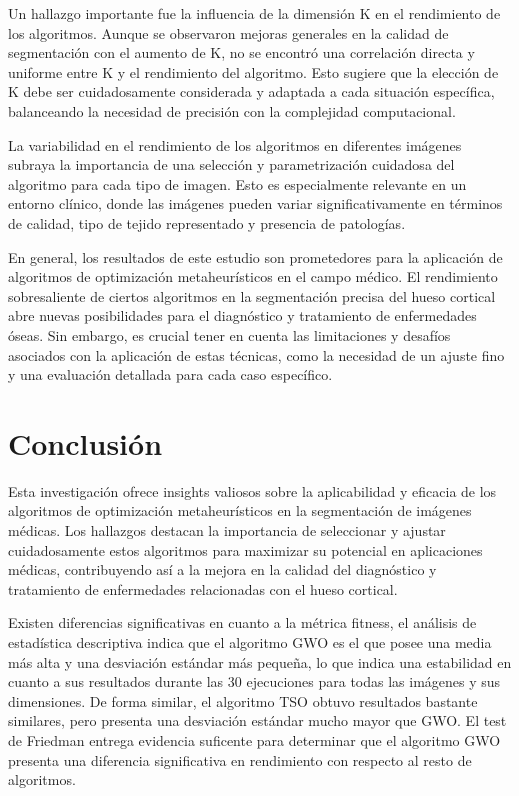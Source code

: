 \documentclass[conference]{IEEEtran}
\begin{document}
\noindent Un hallazgo importante fue la influencia de la dimensión K en el rendimiento de los algoritmos. Aunque se observaron mejoras generales en la calidad de segmentación con el aumento de K, no se encontró una correlación directa y uniforme entre K y el rendimiento del algoritmo. Esto sugiere que la elección de K debe ser cuidadosamente considerada y adaptada a cada situación específica, balanceando la necesidad de precisión con la complejidad computacional.

\noindent La variabilidad en el rendimiento de los algoritmos en diferentes imágenes subraya la importancia de una selección y parametrización cuidadosa del algoritmo para cada tipo de imagen. Esto es especialmente relevante en un entorno clínico, donde las imágenes pueden variar significativamente en términos de calidad, tipo de tejido representado y presencia de patologías.

\noindent En general, los resultados de este estudio son prometedores para la aplicación de algoritmos de optimización metaheurísticos en el campo médico. El rendimiento sobresaliente de ciertos algoritmos en la segmentación precisa del hueso cortical abre nuevas posibilidades para el diagnóstico y tratamiento de enfermedades óseas. Sin embargo, es crucial tener en cuenta las limitaciones y desafíos asociados con la aplicación de estas técnicas, como la necesidad de un ajuste fino y una evaluación detallada para cada caso específico.





\section{Conclusión} \label{sec:co}

\noindent Esta investigación ofrece insights valiosos sobre la aplicabilidad y eficacia de los algoritmos de optimización metaheurísticos en la segmentación de imágenes médicas. Los hallazgos destacan la importancia de seleccionar y ajustar cuidadosamente estos algoritmos para maximizar su potencial en aplicaciones médicas, contribuyendo así a la mejora en la calidad del diagnóstico y tratamiento de enfermedades relacionadas con el hueso cortical.

\noindent Existen diferencias significativas en cuanto a la métrica fitness, el análisis de estadística descriptiva indica que el algoritmo GWO es el que posee una media más alta y una desviación estándar más pequeña, lo que indica una estabilidad en cuanto a sus resultados durante las 30 ejecuciones para todas las imágenes y sus dimensiones. De forma similar, el algoritmo TSO obtuvo resultados bastante similares, pero presenta una desviación estándar mucho mayor que GWO. El test de Friedman entrega evidencia suficente para determinar que el algoritmo GWO presenta una diferencia significativa en rendimiento con respecto al resto de algoritmos.
\end{document}
